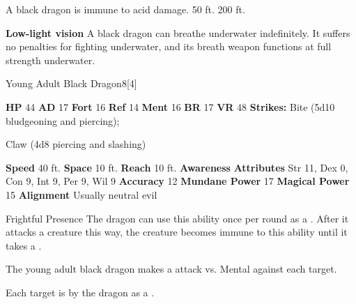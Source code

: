       
       A black dragon is immune to acid damage.
     50 ft.
     200 ft.
    \par\noindent\textbf{Low-light vision}
        A black dragon can breathe underwater indefinitely.
        It suffers no penalties for fighting underwater, and its breath weapon functions at full strength underwater.
  

  \begin{monsubsection}{Young Adult Black Dragon}{8}[4]
    \vspace{-1em}\vspace{-1em}
    \vspace{0em}

    
    

    \begin{spellcontent}
      \begin{spelltargetinginfo}
        \pari \textbf{HP} 44 \monsep
          \textbf{AD} 17 \monsep
          \textbf{Fort} 16 \monsep
          \textbf{Ref} 14 \monsep
          \textbf{Ment} 16
        \pari \textbf{BR} 17 \monsep
        \textbf{VR} 48
        \pari \textbf{Strikes:}
            Bite  (5d10 bludgeoning and piercing);
\par Claw  (4d8 piercing and slashing)
      \end{spelltargetinginfo}
    \end{spellcontent}
    \begin{monsterfooter}
      \pari \textbf{Speed} 40 ft. \monsep
        \textbf{Space} 10 ft. \monsep
        \textbf{Reach} 10 ft.
      \pari \textbf{Awareness} 
      \pari \textbf{Attributes}
        Str 11, Dex 0,
        Con 9, Int 9,
        Per 9, Wil 9
      \pari \textbf{Accuracy} 12 \monsep
        \textbf{Mundane Power} 17 \monsep
      \textbf{Magical Power} 15
      \pari \textbf{Alignment} Usually neutral evil
    \end{monsterfooter}
  \end{monsubsection}
  \begin{freeability}{Frightful Presence}
      The dragon can use this ability once per round as a .
      After it attacks a creature this way, the creature becomes immune to this ability until it takes a .
      \par The young adult black dragon makes a  attack
        vs. Mental against each target.
    
    \hit Each target is  by the dragon as a .
    \end{freeability}
  

